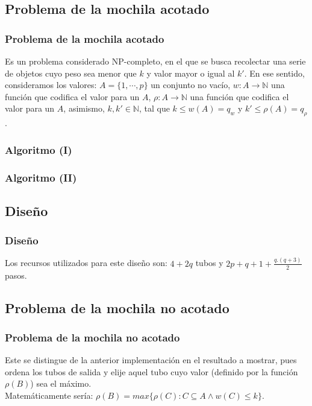 \documentclass[12pt]{beamer}
\begin{document}
 \begin{frame}
    \section{Problema de la mochila acotado}
    \frametitle{Problema de la mochila acotado}
    Es un problema considerado NP-completo, en el que se busca recolectar una serie de objetos cuyo peso sea menor que $k$ y valor mayor o igual al $k'$. En ese sentido, consideramos los valores: $A=\{1,\cdots,p\}$ un conjunto no vacío, $w:A\rightarrow\mathbb{N}$ una función que codifica el valor para un $A$, $\rho:A\rightarrow\mathbb{N}$ una función que codifica el valor para un $A$, asimismo, $k,k'\in\mathbb{N}$, tal que $k\leq w(A)=q_w$ y $k'\leq \rho(A)=q_\rho$.
 \end{frame}
 \begin{frame}
     \frametitle{Algoritmo (I)}
    \begin{algorithmic}[1]
        \State{$\cdots$}
        \EndProcedure
    \end{algorithmic}
 \end{frame}
 \begin{frame}
     \frametitle{Algoritmo (II)}
    \begin{algorithmic}[1]
        \State{$\cdots$}
        \EndFor
        \EndProcedure
    \end{algorithmic}
 \end{frame}
 \begin{frame}
    \subsection{Diseño}
    \frametitle{Diseño}
    Los recursos utilizados para este diseño son: $4+2q$ tubos y $2p+q+1+\frac{q.(q+3)}{2}$ pasos.
 \end{frame}
 \begin{frame}
     \section{Problema de la mochila no acotado}
     \frametitle{Problema de la mochila no acotado}
     Este se distingue de la anterior implementación en el resultado a mostrar, pues ordena los tubos de salida y elije aquel tubo cuyo valor (definido por la función $\rho(B)$) sea el máximo. \\
     Matemáticamente sería: $\rho(B)=max\{\rho(C): C\subseteq A \land w(C)\leq k\}$.
 \end{frame}
\end{document}
